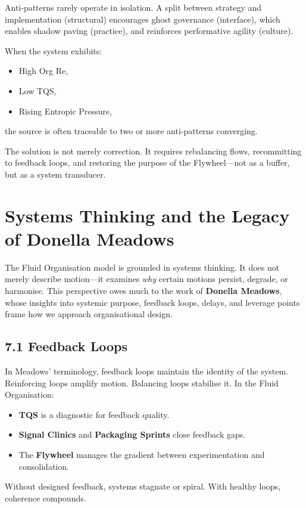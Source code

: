 \documentclass[12pt]{article}
\begin{document}
Anti-patterns rarely operate in isolation. A split between strategy and implementation (structural) encourages ghost governance (interface), which enables shadow paving (practice), and reinforces performative agility (culture).

When the system exhibits:
\begin{itemize}
    \item High Org Re,
    \item Low TQS,
    \item Rising Entropic Pressure,
\end{itemize}
the source is often traceable to two or more anti-patterns converging.

The solution is not merely correction. It requires rebalancing flows, recommitting to feedback loops, and restoring the purpose of the Flywheel---not as a buffer, but as a system transducer.

\section{Systems Thinking and the Legacy of Donella Meadows}

The Fluid Organisation model is grounded in systems thinking. It does not merely describe motion—it examines \textit{why} certain motions persist, degrade, or harmonise. This perspective owes much to the work of \textbf{Donella Meadows}, whose insights into systemic purpose, feedback loops, delays, and leverage points frame how we approach organisational design.

\subsection*{7.1 Feedback Loops}

In Meadows’ terminology, feedback loops maintain the identity of the system. Reinforcing loops amplify motion. Balancing loops stabilise it. In the Fluid Organisation:
\begin{itemize}
    \item \textbf{TQS} is a diagnostic for feedback quality.
    \item \textbf{Signal Clinics} and \textbf{Packaging Sprints} close feedback gaps.
    \item The \textbf{Flywheel} manages the gradient between experimentation and consolidation.
\end{itemize}

Without designed feedback, systems stagnate or spiral. With healthy loops, coherence compounds.
\end{document}
